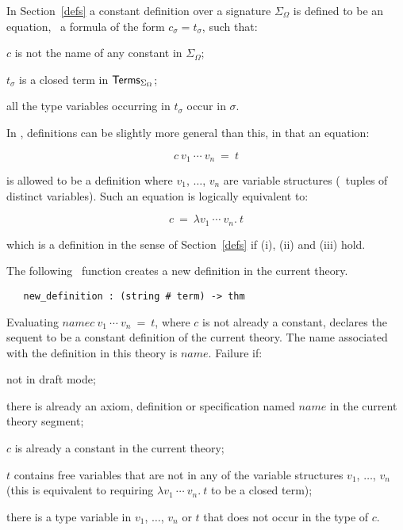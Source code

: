 {In Section~\ref{defs} a constant definition
over a signature $\Sigma_{\Omega}$ is defined to be
an equation, \ie\ a formula of the form $c_{\sigma}=t_{\sigma}$,
such that:
\begin{myenumerate}
\item $c$ is not the name of any constant in $\Sigma_{\Omega}$;
\item $t_{\sigma}$ is a closed term in ${\sf Terms}_{\Sigma_{\Omega}}$;
\item all the type variables occurring in $t_{\sigma}$ occur in $\sigma$.
\end{myenumerate}

In \HOL, definitions can be slightly more general than this, in that
an equation:

\[ c\ v_1\ \cdots\ v_n\ =\ t \]

\noindent is  allowed  to  be a  definition where  $v_1$, $\dots$, $v_n$ are
variable structures (\ie\ tuples of distinct variables).   Such  an equation is
logically equivalent to:

\[ c\ =\ \lambda v_1\ \cdots\ v_n.\  t \]

\noindent which is a definition in the sense of  Section~\ref{defs} if (i),
(ii) and (iii) hold.  

The following  \ML\ function  creates a  new definition in
the current theory.

\begin{boxed}
\begin{verbatim}
   new_definition : (string # term) -> thm
\end{verbatim}\end{boxed}


\noindent Evaluating
 $name$$c\ v_1\ \cdots\ v_n\ =\ t$,
where $c$ is not already a constant, declares the sequent
 to be a constant definition 
of the current theory. The name associated with the definition in
this theory is $name$. 
Failure if:
\begin{myenumerate}
\item not in draft mode;
\item there is already an axiom, definition or specification 
named $name$ in the current theory segment;
\item $c$ is already a constant in the current theory;
\item $t$ contains free variables that are not in any of
the variable structures $v_1$, $\dots$, $v_n$ (this is equivalent
to requiring $\lambda v_1\ \cdots\ v_n.\  t$ to be a closed term);
\item there is a type variable in  $v_1$, $\dots$, $v_n$ or $t$
that does not occur in the type of $c$.
\end{myenumerate}

}
